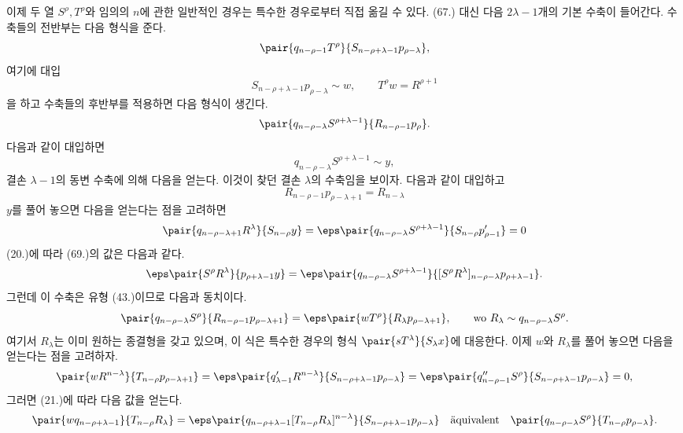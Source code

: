 
이제 두 열 $S^\rho,T^\rho$와 임의의 $n$에 관한 일반적인 경우는 특수한 경우로부터 직접 옮길 수 있다. (67.) 대신 다음 $2\lambda-1$개의 기본 수축이 들어간다.
수축들의 전반부는 다음 형식을 준다.
\[
 \pair{q_{n-\rho-1}T^\rho}{S_{n-\rho+\lambda-1}p_{\rho-\lambda}},
\]
여기에 대입
\[
 S_{n-\rho+\lambda-1}p_{\rho-\lambda}\sim w,
 \qquad T^\rho w=R^{\rho+1}
\]
을 하고 수축들의 후반부를 적용하면 다음 형식이 생긴다.
\[
 \pair{q_{n-\rho-\lambda}S^{\rho+\lambda-1}}{R_{n-\rho-1}p_\rho}.
\]
다음과 같이 대입하면
\[
 q_{n-\rho-\lambda}S^{\rho+\lambda-1}\sim y,
\]
결손 $\lambda-1$의 동변 수축에 의해 다음을 얻는다.
이것이 찾던 결손 $\lambda$의 수축임을 보이자. 다음과 같이 대입하고
\[
 R_{n-\rho-1}p_{\rho-\lambda+1}=R_{n-\lambda}
\]
$y$를 풀어 놓으면 다음을 얻는다는 점을 고려하면
\[
 \pair{q_{n-\rho-\lambda+1}R^\lambda}{S_{n-\rho}y}
 =\eps\pair{q_{n-\rho-\lambda}S^{\rho+\lambda-1}}{S_{n-\rho}p'_{\rho-1}}=0
\]
(20.)에 따라 (69.)의 값은 다음과 같다.
\[
 \eps\pair{S^\rho R^\lambda}{p_{\rho+\lambda-1}y}
 =\eps\pair{q_{n-\rho-\lambda}S^{\rho+\lambda-1}}{[S^\rho R^\lambda]_{n-\rho-\lambda}p_{\rho+\lambda-1}}.
\]
그런데 이 수축은 유형 (43.)이므로 다음과 동치이다.
\[
 \pair{q_{n-\rho-\lambda}S^\rho}{R_{n-\rho-1}p_{\rho-\lambda+1}}
 =\eps\pair{wT^\rho}{R_\lambda p_{\rho-\lambda+1}},
 \qquad \text{wo }R_\lambda\sim q_{n-\rho-\lambda}S^\rho.
\]
여기서 $R_\lambda$는 이미 원하는 종결형을 갖고 있으며, 이 식은 특수한 경우의 형식 $\pair{sT^\lambda}{S_\lambda x}$에 대응한다. 이제 $w$와 $R_\lambda$를 풀어 놓으면 다음을 얻는다는 점을 고려하자.
\[
 \pair{wR^{n-\lambda}}{T_{n-\rho}p_{\rho-\lambda+1}}
 =\eps\pair{q'_{\lambda-1}R^{n-\lambda}}{S_{n-\rho+\lambda-1}p_{\rho-\lambda}}
 =\eps\pair{q''_{n-\rho-1}S^\rho}{S_{n-\rho+\lambda-1}p_{\rho-\lambda}}=0,
\]
그러면 (21.)에 따라 다음 값을 얻는다.
\[
 \pair{wq_{n-\rho+\lambda-1}}{T_{n-\rho}R_\lambda}
 =\eps\pair{q_{n-\rho+\lambda-1}[T_{n-\rho}R_\lambda]^{n-\lambda}}{S_{n-\rho+\lambda-1}p_{\rho-\lambda}}
 \quad\text{\"aquivalent}\quad
 \pair{q_{n-\rho-\lambda}S^\rho}{T_{n-\rho}p_{\rho-\lambda}}.
\]
